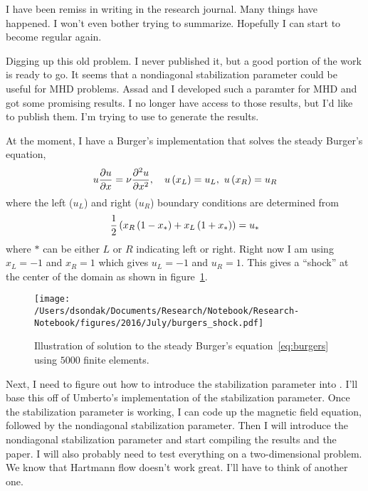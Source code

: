 



I have been remiss in writing in the research journal.  Many things have happened.
I won't even bother trying to summarize.  Hopefully I can start to become regular
again.

Digging up this old problem.  I never published it, but a good portion of the work is ready to go.
It seems that a nondiagonal stabilization parameter could be useful for MHD problems.  Assad and I
developed such a paramter for MHD and got some promising results.  I no longer have access to those
results, but I'd like to publish them.  I'm trying to use \fenics to generate the results.

At the moment, I have a Burger's implementation that solves the steady Burger's equation,
\begin{align}
 u\pdeone{u}{x} = \nu\pden{u}{x}{2}, \quad u\lr{x_{L}} = u_{L}, \ u\lr{x_{R}} = u_{R} \label{eq:burgers}
\end{align}
where the left ($u_{L}$) and right ($u_{R}$) boundary conditions are determined from
\begin{align}
  \frac{1}{2}\left(x_{R}\left(1-x_{*}\right) + x_{L}\left(1+x_{*}\right)\right) = u_{*}
\end{align}
where $*$ can be either $L$ or $R$ indicating left or right.  Right now I am using
$x_{L} = -1$ and $x_{R} = 1$ which gives $u_{L} = -1$ and $u_{R} = 1$.  This gives
a ``shock'' at the center of the domain as shown in figure~\ref{fig:burgers_shock}.
\begin{figure}[h!]
  \centering
  \texttt{[image: /Users/dsondak/Documents/Research/Notebook/Research-Notebook/figures/2016/July/burgers\_shock.pdf]}
  \caption{Illustration of \fenics solution to the steady Burger's equation~\eqref{eq:burgers} using $5000$ finite elements.}
  \label{fig:burgers_shock}
\end{figure}

Next, I need to figure out how to introduce the stabilization parameter into
\fenics.  I'll base this off of Umberto's \fenics implementation of the
stabilization parameter.  Once the stabilization parameter is working, I can 
code up the magnetic field equation, followed by the nondiagonal stabilization
parameter.  Then I will introduce the nondiagonal stabilization parameter and
start compiling the results and the paper.  I will also probably need to
test everything on a two-dimensional problem.  We know that Hartmann flow
doesn't work great.  I'll have to think of another one.


